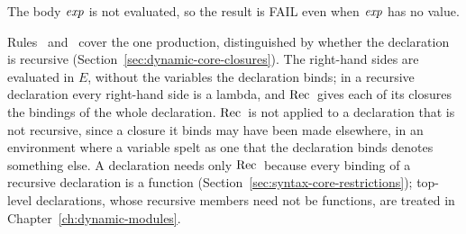 
  {}

  {}

\begin{rulecomments}
 The body $\mathit{exp}$ is not evaluated, so the result
is FAIL even when $\mathit{exp}$ has no value.
\end{rulecomments}


  {}

  {}

\begin{rulecomments}
 Rules~
and~ cover the one production, distinguished by whether the declaration is recursive
(Section~\ref{sec:dynamic-core-closures}). The right-hand sides are evaluated
in $E$, without the variables the declaration binds; in a recursive
declaration every right-hand side is a lambda, and $\mathrm{Rec}\,$ gives each of its
closures the bindings of the whole declaration. $\mathrm{Rec}\,$ is not applied to a
declaration that is not recursive, since a closure it binds may have been
made elsewhere, in an environment where a variable spelt as one that the
declaration binds denotes something else. A  declaration needs only
$\mathrm{Rec}\,$ because every binding of a recursive  declaration is a
function (Section~\ref{sec:syntax-core-restrictions}); top-level declarations,
whose recursive members need not be functions, are treated in
Chapter~\ref{ch:dynamic-modules}. %
\end{rulecomments}


  {}

  {}

